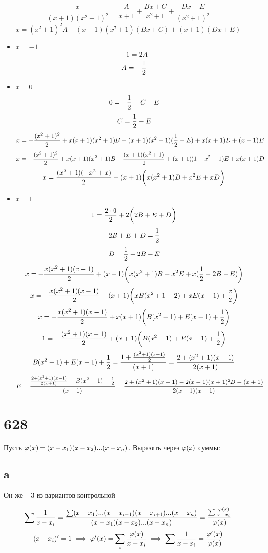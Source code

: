 $$ \frac{x}{(x + 1)(x^2 + 1)^2} = \frac{A}{x + 1} + \frac{Bx + C}{x^2 + 1} + \frac{Dx + E}{(x^2 + 1)^2} $$
$$ x = (x^2 + 1)^2A + (x + 1)(x^2 + 1)(Bx + C) + (x + 1)(Dx + E) $$
\begin{itemize}
	\item $ x = -1 $
    $$ -1 = 2A $$
    $$ A = -\half $$
    \item $ x = 0 $
    $$ 0 = -\half + C + E $$
    $$ C = \half - E $$
    $$ x = -\half[(x^2 + 1)^2] + x(x + 1)(x^2 + 1)B + (x + 1)(x^2 + 1)(\half - E) + x(x + 1)D + (x + 1)E $$
    $$ x = -\half[(x^2 + 1)^2] + x(x + 1)(x^2 + 1)B + \half[(x + 1)(x^2 + 1)] + (x + 1)(1 - x^2 - 1)E + x(x + 1)D $$
    $$ x = \half[(x^2 + 1)( -x^2 + x)] + (x + 1) \bigg( x(x^2 + 1)B + x^2E + xD \bigg) $$
    \item $ x = 1 $
    $$ 1 = \half[2 \cdot 0] + 2 \bigg( 2B + E + D \bigg) $$
    $$ 2B + E + D = \half $$
    $$ D = \half - 2B - E $$
    $$ x = -\half[x(x^2 + 1)(x - 1)] + (x + 1) \bigg( x(x^2 + 1)B + x^2E + x(\half - 2B - E) \bigg) $$
    $$ x = -\half[x(x^2 + 1)(x - 1)] + (x + 1) \bigg( xB(x^2 + 1 - 2) + xE(x - 1) + \half[x] \bigg) $$
    $$ x = -\half[x(x^2 + 1)(x - 1)] + x(x + 1) \bigg( B(x^2 - 1) + E(x - 1) + \half \bigg) $$
    $$ 1 = -\half[(x^2 + 1)(x - 1)] + (x + 1) \bigg( B(x^2 - 1) + E(x - 1) + \half \bigg) $$
    $$ B(x^2 - 1) + E(x - 1) + \half = \frac{1 + \half[(x^2 + 1)(x - 1)]}{(x + 1)} = \frac{2 + (x^2 + 1)(x - 1)}{2(x + 1)} $$
    $$ E = \frac{\frac{2 + (x^2 + 1)(x - 1)}{2(x + 1)} - B(x^2 - 1) - \half}{(x - 1)} = \frac{2 + (x^2 + 1)(x - 1) - 2(x - 1)(x + 1)^2B - (x + 1)}{2(x + 1)(x - 1)} $$
\end{itemize}


\section{628}

Пусть $ \vphi(x) = (x - x_1)(x - x_2)...(x - x_n) $. Выразить через $ \vphi(x) $ суммы:

\subsection{a}

Он же -- 3 из вариантов контрольной

$$ \sum \frac1{x - x_i} = \frac{\sum (x - x_1)...(x - x_{i - 1})(x - x_{i + 1})...(x - x_n)}{(x - x_1)(x - x_2)...(x - x_n)} = \frac{\sum \frac{\vphi(x)}{x - x_i}}{\vphi(x)} $$
$$ (x - x_i)' = 1 \implies \vphi'(x) = \sum_i \frac{\vphi(x)}{x - x_i} \implies \sum \frac1{x - x_i} = \frac{\vphi'(x)}{\vphi(x)} $$

